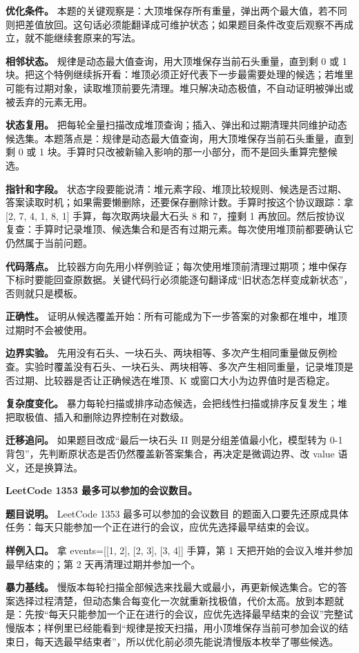 \textbf{优化条件。} 本题的关键观察是：大顶堆保存所有重量，弹出两个最大值，若不同则把差值放回。这句话必须能翻译成可维护状态；如果题目条件改变后观察不再成立，就不能继续套原来的写法。

\textbf{相邻状态。} 规律是动态最大值查询，用大顶堆保存当前石头重量，直到剩 0 或 1 块。把这个特例继续拆开看：堆顶必须正好代表下一步最需要处理的候选；若堆里可能有过期对象，读取堆顶前要先清理。堆只解决动态极值，不自动证明被弹出或被丢弃的元素无用。

\textbf{状态复用。} 把每轮全量扫描改成堆顶查询；插入、弹出和过期清理共同维护动态候选集。本题落点是：规律是动态最大值查询，用大顶堆保存当前石头重量，直到剩 0 或 1 块。手算时只改被新输入影响的那一小部分，而不是回头重算完整候选。

\textbf{指针和字段。} 状态字段要能说清：堆元素字段、堆顶比较规则、候选是否过期、答案读取时机；如果需要懒删除，还要保存删除计数。手算时按这个协议跟踪：拿 [2, 7, 4, 1, 8, 1] 手算，每次取两块最大石头 8 和 7，撞剩 1 再放回。然后按协议复查：手算时记录堆顶、候选集合和是否有过期元素。每次使用堆顶前都要确认它仍然属于当前问题。

\textbf{代码落点。} 比较器方向先用小样例验证；每次使用堆顶前清理过期项；堆中保存下标时要能回查原数据。关键代码行必须能逐句翻译成“旧状态怎样变成新状态”，否则就只是模板。

\textbf{正确性。} 证明从候选覆盖开始：所有可能成为下一步答案的对象都在堆中，堆顶过期时不会被使用。

\textbf{边界实验。} 先用没有石头、一块石头、两块相等、多次产生相同重量做反例检查。实验时覆盖没有石头、一块石头、两块相等、多次产生相同重量，记录堆顶是否过期、比较器是否让正确候选在堆顶、K 或窗口大小为边界值时是否稳定。

\textbf{复杂度变化。} 暴力每轮扫描或排序动态候选，会把线性扫描或排序反复发生；堆把取极值、插入和删除边界控制在对数级。

\textbf{迁移追问。} 如果题目改成“最后一块石头 II 则是分组差值最小化，模型转为 0-1 背包”，先判断原状态是否仍然覆盖新答案集合，再决定是微调边界、改 value 语义，还是换算法。

\noindent\textbf{LeetCode 1353 最多可以参加的会议数目。}

\textbf{题目说明。} LeetCode 1353 最多可以参加的会议数目 的题面入口要先还原成具体任务：每天只能参加一个正在进行的会议，应优先选择最早结束的会议。

\textbf{样例入口。} 拿 events=[[1, 2], [2, 3], [3, 4]] 手算，第 1 天把开始的会议入堆并参加最早结束的；第 2 天再清理过期并参加一个。

\textbf{暴力基线。} 慢版本每轮扫描全部候选来找最大或最小，再更新候选集合。它的答案选择过程清楚，但动态集合每变化一次就重新找极值，代价太高。放到本题就是：先按“每天只能参加一个正在进行的会议，应优先选择最早结束的会议”完整试慢版本；样例里已经能看到“规律是按天扫描，用小顶堆保存当前可参加会议的结束日，每天选最早结束者”，所以优化前必须先能说清慢版本枚举了哪些候选。

